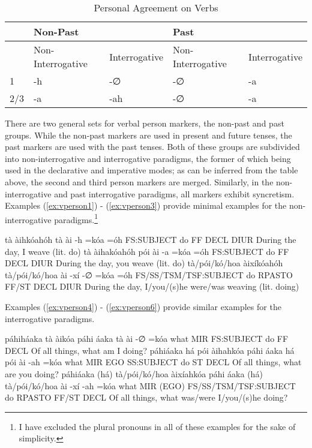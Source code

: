 \documentclass[a4paper, 12pt, oneside]{memoir}
\begin{document}
\begin{table}[H]
    \centering
    \begin{tabular}{@{}lllll@{}}
    \toprule
        & \multicolumn{2}{l}{Non-Past}      & \multicolumn{2}{l}{Past}          \\ \midrule
        & Non-Interrogative & Interrogative & Non-Interrogative & Interrogative \\ \midrule
    1   & -h                & -∅            & -∅                & -a            \\
    2/3 & -a                & -ah           & -∅                & -a            \\ \bottomrule
    \end{tabular}
    \caption{Personal Agreement on Verbs}
    \label{t:vperson}
\end{table}

There are two general sets for verbal person markers, the non-past and past groups. While the non-past markers are used in present and future tenses, the past markers are used with the past tenses. Both of these groups are subdivided into non-interrogative and interrogative paradigms, the former of which being used in the declarative and imperative modes; as can be inferred from the table above, the second and third person markers are merged. Similarly, in the non-interrogative and past interrogative paradigms, all markers exhibit syncretism.
Examples (\ref{ex:vperson1}) - (\ref{ex:vperson3}) provide minimal examples for the non-interrogative paradigms.\footnote{I have excluded the plural pronouns in all of these examples for the sake of simplicity.}
\begin{examples}
    \ex \label{ex:vperson1}
    \words tà àihkóahóh
    \bits tà ài -h =kóa =óh
    \gloss FS:SUBJECT do FF DECL DIUR
    \tr During the day, I weave (lit. do)
    \ex \label{ex:vperson2}
    \words tà àihakóahóh
    \bits pói ài -a =kóa =óh
    \gloss FS:SUBJECT do FF DECL DIUR
    \tr During the day, you weave (lit. do)
    \ex \label{ex:vperson3}
    \words tà/pói/kó/hoa àixíkóahóh
    \bits tà/pói/kó/hoa ài -xí -∅ =kóa =óh
    \gloss FS{/}SS{/}TSM{/}TSF:SUBJECT do RPASTO FF{/}ST DECL DIUR
    \tr During the day, I/you/(s)he were/was weaving (lit. doing)
\end{examples}
Examples (\ref{ex:vperson4}) - (\ref{ex:vperson6}) provide similar examples for the interrogative paradigms.
\begin{examples}
    \newbaarucmd{\cl}{\baarujuncture{\texttt{==}}}
    \ex \label{ex:vperson4}
    \words páhiháaka tà àikóa
    \bits páhi \cl áaka tà ài -∅ =kóa
    \gloss what MIR FS:SUBJECT do FF DECL
    \tr Of all things, what am I doing?
    \ex \label{ex:vperson5}
    \words páhiáaka há pói àihahkóa
    \bits páhi \cl áaka há pói ài -ah =kóa 
    \gloss what MIR EGO SS:SUBJECT do ST DECL
    \tr Of all things, what are you doing?
    \ex \label{ex:vperson6}    
    \words páhiáaka (há) tà/pói/kó/hoa àixíahkóa
    \bits páhi \cl áaka (há) tà/pói/kó/hoa ài -xí -ah =kóa 
    \gloss what MIR (EGO) FS{/}SS{/}TSM{/}TSF:SUBJECT do RPASTO FF{/}ST DECL
    \tr Of all things, what was/were I/you/(s)he doing?
\end{examples}
\end{document}
